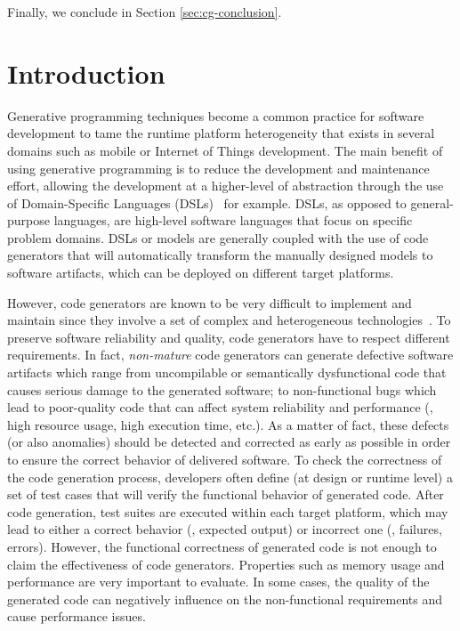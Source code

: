 Finally, we conclude in Section \ref{sec:cg-conclusion}. 


\section{Introduction}
\label{sec:cg_introduction}

Generative programming techniques become a common practice for software development to tame the runtime platform heterogeneity that exists in several domains such as mobile or Internet of Things development. 
The main benefit of using generative programming is to reduce the development and maintenance effort, allowing the development at a higher-level of abstraction through the use of Domain-Specific Languages (DSLs)~\cite{brambilla2012model} for example. 
DSLs, as opposed to general-purpose languages, are high-level software languages that focus on specific problem domains. 
DSLs or models are generally coupled with the use of code generators that will automatically transform the manually designed models to software artifacts, which can be deployed on different target platforms. 

However, code generators are known to be very difficult to implement and maintain since they involve a set of complex and heterogeneous technologies~\cite{france2007model,guana2015developers}.
To preserve software reliability and quality, code generators have to respect different requirements. In fact, \textit{non-mature} code generators can generate defective software artifacts which range from uncompilable or semantically dysfunctional code that causes serious damage to the generated software; to non-functional bugs which lead to poor-quality code that can affect system reliability and performance (\eg, high resource usage, high execution time, etc.). 
As a matter of fact, these defects (or also anomalies) should be detected and corrected as early as possible in order to ensure the correct behavior of delivered software.
To check the correctness of the code generation process, developers often define (at design or runtime level) a set of test cases that will verify the functional behavior of generated code. 
After code generation, test suites are executed within each target platform, which may lead to either a correct behavior (\ie, expected output) or incorrect one (\ie, failures, errors).
However, the functional correctness of generated code is not enough to claim the effectiveness of code generators. Properties such as memory usage and performance are very important to evaluate. In some cases, the quality of the generated code can negatively influence on the non-functional requirements and cause performance issues\cite{hundt2011loop,ray2014large}.

